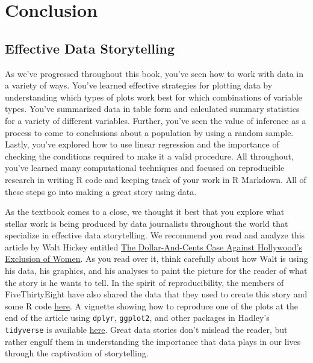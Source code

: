 \documentclass[]{tufte-book}
\begin{document}
\part{Conclusion}\label{part-conclusion}

\chapter{Effective Data Storytelling}\label{effective-data-storytelling}

As we've progressed throughout this book, you've seen how to work with
data in a variety of ways. You've learned effective strategies for
plotting data by understanding which types of plots work best for which
combinations of variable types. You've summarized data in table form and
calculated summary statistics for a variety of different variables.
Further, you've seen the value of inference as a process to come to
conclusions about a population by using a random sample. Lastly, you've
explored how to use linear regression and the importance of checking the
conditions required to make it a valid procedure. All throughout, you've
learned many computational techniques and focused on reproducible
research in writing R code and keeping track of your work in R Markdown.
All of these steps go into making a great story using data.

As the textbook comes to a close, we thought it best that you explore
what stellar work is being produced by data journalists throughout the
world that specialize in effective data storytelling. We recommend you
read and analyze this article by Walt Hickey entitled
\href{http://fivethirtyeight.com/features/the-dollar-and-cents-case-against-hollywoods-exclusion-of-women/}{The
Dollar-And-Cents Case Against Hollywood's Exclusion of Women}. As you
read over it, think carefully about how Walt is using his data, his
graphics, and his analyses to paint the picture for the reader of what
the story is he wants to tell. In the spirit of reproducibility, the
members of FiveThirtyEight have also shared the data that they used to
create this story and some R code
\href{https://github.com/fivethirtyeight/data/tree/master/bechdel}{here}.
A vignette showing how to reproduce one of the plots at the end of the
article using \texttt{dplyr}, \texttt{ggplot2}, and other packages in
Hadley's \texttt{tidyverse} is available
\href{https://cran.r-project.org/web/packages/fivethirtyeight/vignettes/bechdel.html}{here}.
Great data stories don't mislead the reader, but rather engulf them in
understanding the importance that data plays in our lives through the
captivation of storytelling.
\end{document}
